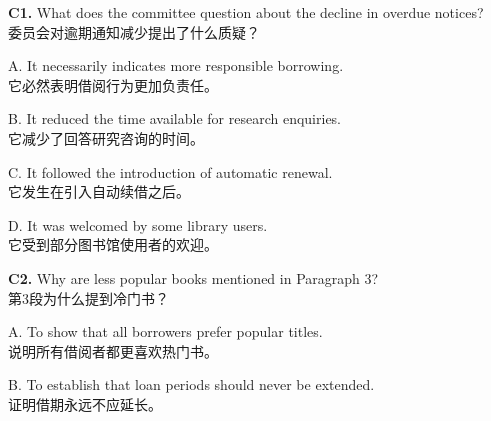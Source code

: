 \documentclass[a4paper,11pt,openany]{report}
\newcommand{\zhline}[1]{{\CJKsf\color{bodygrey}#1}}
\begin{document}
\begin{samepage}
\textbf{C1.} What does the committee question about the decline in overdue notices?\\
\zhline{委员会对逾期通知减少提出了什么质疑？}
\par\end{samepage}

\begin{samepage}
A. It necessarily indicates more responsible borrowing.\\
\zhline{它必然表明借阅行为更加负责任。}
\par\end{samepage}

\begin{samepage}
B. It reduced the time available for research enquiries.\\
\zhline{它减少了回答研究咨询的时间。}
\par\end{samepage}

\begin{samepage}
C. It followed the introduction of automatic renewal.\\
\zhline{它发生在引入自动续借之后。}
\par\end{samepage}

\begin{samepage}
D. It was welcomed by some library users.\\
\zhline{它受到部分图书馆使用者的欢迎。}
\par\end{samepage}

\begin{samepage}
\textbf{C2.} Why are less popular books mentioned in Paragraph 3?\\
\zhline{第3段为什么提到冷门书？}
\par\end{samepage}

\begin{samepage}
A. To show that all borrowers prefer popular titles.\\
\zhline{说明所有借阅者都更喜欢热门书。}
\par\end{samepage}

\begin{samepage}
B. To establish that loan periods should never be extended.\\
\zhline{证明借期永远不应延长。}
\par\end{samepage}
\end{document}
